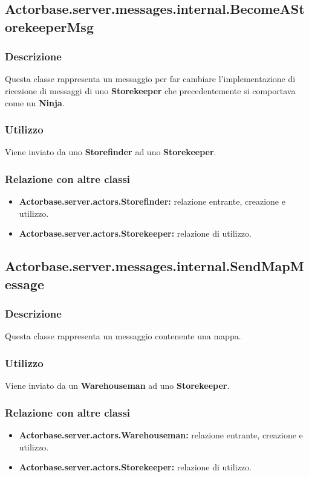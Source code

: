 \documentclass[a4paper]{article}
\begin{document}
		\subsection{Actorbase.server.messages.internal.BecomeAStorekeeperMsg}
			\subsubsection{Descrizione}
				Questa classe rappresenta un messaggio per far cambiare l'implementazione di ricezione di messaggi di uno \textbf{Storekeeper} 
				che precedentemente si comportava come un \textbf{Ninja}.
				
			\subsubsection{Utilizzo}
				Viene inviato da uno \textbf{Storefinder} ad uno \textbf{Storekeeper}.
				
			\subsubsection{Relazione con altre classi}
				\begin{itemize}
					\item \textbf{Actorbase.server.actors.Storefinder:} relazione entrante, creazione e utilizzo.
					\item \textbf{Actorbase.server.actors.Storekeeper:} relazione di utilizzo.
				\end{itemize}
				
		\subsection{Actorbase.server.messages.internal.SendMapMessage}
			\subsubsection{Descrizione}
				Questa classe rappresenta un messaggio contenente una mappa. 
				
			\subsubsection{Utilizzo}
				Viene inviato da un \textbf{Warehouseman} ad uno \textbf{Storekeeper}.
				
			\subsubsection{Relazione con altre classi}
				\begin{itemize}
					\item \textbf{Actorbase.server.actors.Warehouseman:} relazione entrante, creazione e utilizzo.
					\item \textbf{Actorbase.server.actors.Storekeeper:} relazione di utilizzo.
				\end{itemize}
				
\end{document}
